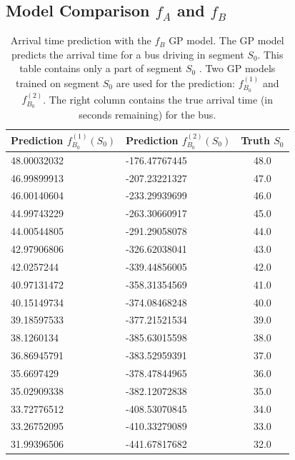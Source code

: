 \subsection{Model Comparison $f_A$ and $f_B$}
\begin{table}
    \centering
    \caption[Arrival time prediction with the $f_B$ GP model]%
    {{\small Arrival time prediction with the $f_B$ GP model.
    The GP model predicts the arrival time for a bus driving in segment $S_0$.
    This table contains only a part of segment $S_0$ .
    Two GP models trained on segment $S_0$ are used for the prediction: $f^{(1)}_{B_0}$ and $f^{(2)}_{B_0}$.
    The right column contains the true arrival time (in seconds remaining) for the bus.}}
    \label{table:f_B-examples} 
    \begin{tabular}{ |l|l|c| } 
        \hline
        Prediction $f^{(1)}_{B_0}(S_0)$ & Prediction $f^{(2)}_{B_0}(S_0)$ & Truth $S_0$ \\ [0.5ex] 
        \hline
        48.00032032 & -176.47767445 & 48.0 \\
        46.99899913 & -207.23221327 & 47.0 \\
        46.00140604 & -233.29939699 & 46.0 \\
        44.99743229 & -263.30660917 & 45.0 \\
        44.00544805 & -291.29058078 & 44.0 \\
        42.97906806 & -326.62038041 & 43.0 \\
        42.0257244 & -339.44856005 & 42.0 \\
        40.97131472 & -358.31354569 & 41.0 \\
        40.15149734 & -374.08468248 & 40.0 \\
        39.18597533 & -377.21521534 & 39.0 \\
        38.1260134 & -385.63015598 & 38.0 \\
        36.86945791 & -383.52959391 & 37.0 \\
        35.6697429 & -378.47844965 & 36.0 \\
        35.02909338 & -382.12072838 & 35.0 \\
        33.72776512 & -408.53070845 & 34.0 \\
        33.26752095 & -410.33279089 & 33.0 \\
        31.99396506 & -441.67817682 & 32.0 \\ 
        \hline
    \end{tabular}
\end{table}

